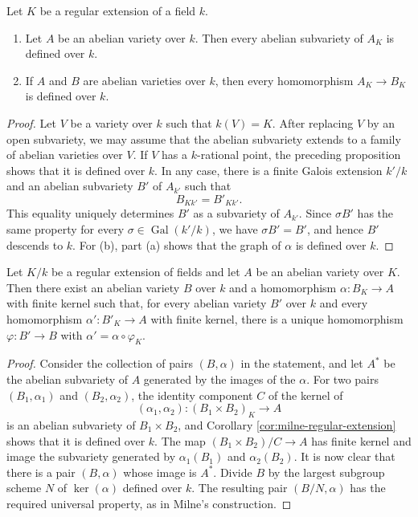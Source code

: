 \begin{corollary}\label{cor:milne-regular-extension}
Let $K$ be a regular extension of a field $k$.
\begin{enumerate}
\item Let $A$ be an abelian variety over $k$.  Then every abelian subvariety
of $A_K$ is defined over $k$.
\item If $A$ and $B$ are abelian varieties over $k$, then every homomorphism
$A_K\to B_K$ is defined over $k$.
\end{enumerate}
\end{corollary}
\begin{proof}
Let $V$ be a variety over $k$ such that $k(V)=K$.  After replacing $V$ by an
open subvariety, we may assume that the abelian subvariety extends to a family
of abelian varieties over $V$.  If $V$ has a $k$-rational point, the preceding
proposition shows that it is defined over $k$.  In any case, there is a finite
Galois extension $k'/k$ and an abelian subvariety $B'$ of $A_{k'}$ such that
\[
B_{Kk'}=B'_{Kk'}.
\]
This equality uniquely determines $B'$ as a subvariety of $A_{k'}$.  Since
$\sigma B'$ has the same property for every $\sigma\in\operatorname{Gal}(k'/k)$,
we have $\sigma B'=B'$, and hence $B'$ descends to $k$.  For (b), part (a)
shows that the graph of $\alpha$ is defined over $k$.
\end{proof}
\begin{theorem}[$K/k$-trace]\label{thm:milne-trace}
Let $K/k$ be a regular extension of fields and let $A$ be an abelian variety
over $K$.  Then there exist an abelian variety $B$ over $k$ and a
homomorphism $\alpha:B_K\to A$ with finite kernel such that, for every
abelian variety $B'$ over $k$ and every homomorphism
$\alpha':B'_K\to A$ with finite kernel, there is a unique homomorphism
$\varphi:B'\to B$ with $\alpha'=\alpha\circ\varphi_K$.
\end{theorem}

\begin{proof}
Consider the collection of pairs $(B,\alpha)$ in the statement, and let
$A^*$ be the abelian subvariety of $A$ generated by the images of the
$\alpha$.  For two pairs $(B_1,\alpha_1)$ and $(B_2,\alpha_2)$, the identity
component $C$ of the kernel of
\[
(\alpha_1,\alpha_2):(B_1\times B_2)_K\longrightarrow A
\]
is an abelian subvariety of $B_1\times B_2$, and Corollary
\ref{cor:milne-regular-extension} shows that it is defined over $k$.  The map
$(B_1\times B_2)/C\to A$ has finite kernel and image the subvariety generated
by $\alpha_1(B_1)$ and $\alpha_2(B_2)$.  It is now clear that there is a pair
$(B,\alpha)$ whose image is $A^*$.  Divide $B$ by the largest subgroup scheme
$N$ of $\ker(\alpha)$ defined over $k$.  The resulting pair $(B/N,\alpha)$
has the required universal property, as in Milne's construction.

\end{proof}

